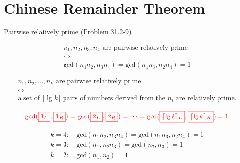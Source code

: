 \section{Chinese Remainder Theorem}

\begin{frame}{Pairwise relatively prime (Problem 31.2-9)}
  \begin{exampleblock}{}
	\begin{gather*}
	  n_1, n_2, n_3, n_4 \text{ are pairwise relatively prime} \\
	  \iff \\
	  \text{gcd}(n_1n_2, n_3n_4) = \text{gcd}(n_1n_3, n_2n_4) = 1
	\end{gather*}
  \end{exampleblock}
\end{frame}
\begin{frame}{}
  \begin{exampleblock}{}
	\begin{gather*}
	  n_1, n_2, \dots, n_k \text{ are pairwise relatively prime} \\
	  \iff \\
	  \text{a set of } \lceil \lg k \rceil \text{ pairs of numbers derived from the } n_i \text{ are relatively prime}.
	\end{gather*}
  \end{exampleblock}

  \pause
  \[
	\textcolor{red}{\text{gcd}(\fbox{$1_L$}, \fbox{$1_R$}) 
	= \text{gcd}(\fbox{$2_L$}, \fbox{$2_R$}) 
	= \cdots 
	= \text{gcd}(\fbox{$\lceil \lg k \rceil_L$}, \fbox{$\lceil \lg k \rceil_R$}) = 1}
  \]

  \pause
  \begin{gather*}
    k = 4: \quad \text{gcd}(n_1n_2, n_3n_4) = \text{gcd}(n_1n_3, n_2n_4) = 1 \\
	k = 3: \quad \text{gcd}(n_1, n_2n_3) = \text{gcd}(n_2, n_3) = 1 \\
	k = 2: \quad \text{gcd}(n_1, n_2) = 1
  \end{gather*}
\end{frame}

